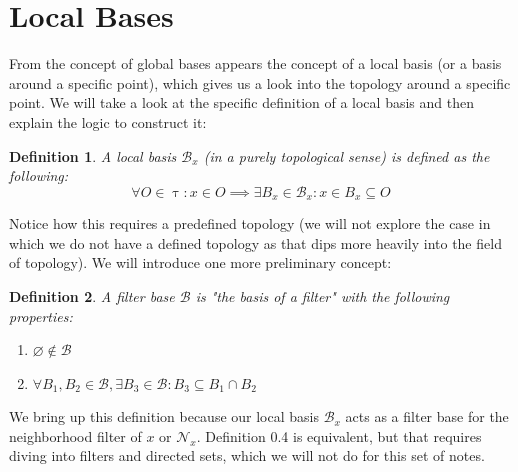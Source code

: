 \documentclass{exam}
\newtheorem{defn}{Definition}[section]
\begin{document}
\section*{Local Bases}
From the concept of global bases appears the concept of a local basis (or a basis around a specific point), which gives us a look into the topology around a specific point. We will take a look at the specific definition of a local basis and then explain the logic to construct it:
\begin{defn} A local basis $\mathcal{B}_x$ (in a purely topological sense) is defined as the following:
\begin{equation*}
  \forall O \in \uptau: x \in O \implies \exists B_x \in \mathcal{B}_x: x \in B_x \subseteq O
\end{equation*}
\end{defn}
Notice how this requires a predefined topology (we will not explore the case in which we do not have a defined topology as that dips more heavily into the field of topology). We will introduce one more preliminary concept:
\begin{defn}
A filter base $\mathcal{B}$ is "the basis of a filter" with the following properties:
\begin{enumerate}
  \item $\varnothing \notin \mathcal{B}$
  \item $\forall B_1, B_2 \in \mathcal{B}, \exists B_3 \in \mathcal{B}: B_3 \subseteq B_1 \cap B_2$
\end{enumerate}
\end{defn}
We bring up this definition because our local basis $\mathcal{B}_x$ acts as a filter base for the neighborhood filter of $x$ or $\mathcal{N}_x$. Definition 0.4 is equivalent, but that requires diving into filters and directed sets, which we will not do for this set of notes.\\
\end{document}
